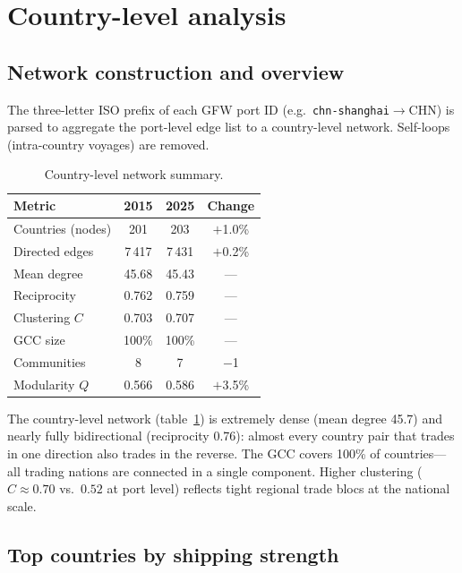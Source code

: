 \documentclass[a4paper,10pt,twocolumn]{article}
\begin{document}
\section{Country-level analysis}

\subsection{Network construction and overview}

The three-letter ISO prefix of each GFW port ID
(e.g.\ \texttt{chn-shanghai}$\to$CHN) is parsed to aggregate the
port-level edge list to a country-level network.
Self-loops (intra-country voyages) are removed.

\begin{table}[t]
\centering
\caption{Country-level network summary.}
\label{tab:country}
{\small
\begin{tabular}{@{}lccc@{}}
\toprule
\rowcolor{TableH}
\textbf{Metric} & \textbf{2015} & \textbf{2025} & \textbf{Change} \\
\midrule
Countries (nodes) & 201    & 203    & $+$1.0\%  \\
Directed edges    & 7\,417 & 7\,431 & $+$0.2\%  \\
Mean degree       & 45.68  & 45.43  & ---       \\
Reciprocity       & 0.762  & 0.759  & ---       \\
Clustering $C$    & 0.703  & 0.707  & ---       \\
GCC size          & 100\%  & 100\%  & ---       \\
Communities       & 8      & 7      & $-$1      \\
Modularity $Q$    & 0.566  & 0.586  & $+$3.5\%  \\
\bottomrule
\end{tabular}}
\end{table}

The country-level network (table~\ref{tab:country}) is extremely
dense (mean degree 45.7) and nearly fully bidirectional
(reciprocity 0.76): almost every country pair that trades in one
direction also trades in the reverse.
The GCC covers 100\% of countries---all trading nations are
connected in a single component.
Higher clustering ($C\approx0.70$ vs.\ $0.52$ at port level)
reflects tight regional trade blocs at the national scale.

\subsection{Top countries by shipping strength}
\end{document}
